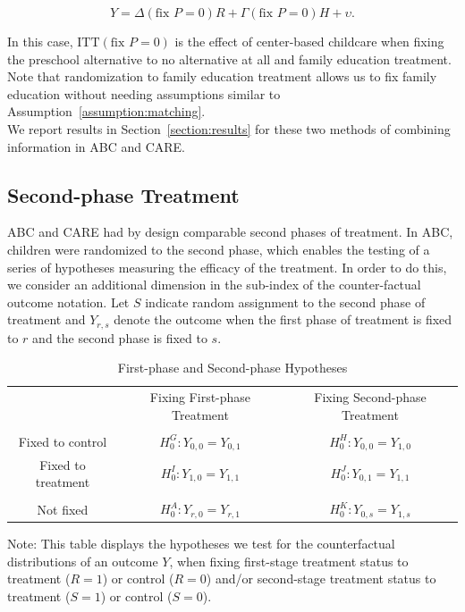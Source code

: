 \begin{equation}
Y = \Delta \left( \text{fix } P = 0\right) R +  \Gamma \left( \text{fix } P = 0\right) H + \upsilon. \label{eq:fixfam}
\end{equation}

\noindent In this case, $\text{ITT} \left( \text{fix } P = 0\right)$ is the effect of center-based childcare when fixing the preschool alternative to no alternative at all and family education treatment. Note that randomization to family education treatment allows us to fix family education without needing assumptions similar to Assumption~\ref{assumption:matching}.\\

\noindent We report results in Section~\ref{section:results} for these two methods of combining information in ABC and CARE.

\subsection{Second-phase Treatment}

\noindent ABC and CARE had by design comparable second phases of treatment. In ABC, children were randomized to the second phase, which enables the testing of a series of hypotheses measuring the efficacy of the treatment. 
In order to do this, we consider an additional dimension in the sub-index of the counter-factual outcome notation. Let $S$ indicate random assignment to the second phase of treatment and $Y_{r,s}$ denote the outcome when the first phase of treatment is fixed to $r$ and the second phase is fixed to $s$.\\

\begin{table}[H] 
\begin{threeparttable}
\caption{First-phase and Second-phase Hypotheses}
\label{table:hypotheses}
\centering 
\begin{tabular}{ccc} \hline \hline
 & Fixing First-phase Treatment & Fixing Second-phase Treatment \\ \\ \hline
Fixed to control       & $H_{0}^G: Y_{0,0} = Y_{0,1}$ & $H_{0}^H: Y_{0,0} = Y_{1,0}$ \\
Fixed to treatment  & $H_{0}^I: Y_{1,0} = Y_{1,1}$ & $H_{0}^J: Y_{0,1} = Y_{1,1}$ \\ \\ \hline
Not fixed                 & $H_{0}^A: Y_{r,0} = Y_{r,1}$ & $H_{0}^K: Y_{0,s} = Y_{1,s}$ \\  \hline \hline
\end{tabular}
\begin{tablenotes}
\footnotesize
\item Note: This table displays the hypotheses we test for the counterfactual distributions of an outcome $Y$, when fixing first-stage treatment status to treatment ($R = 1$) or control ($R = 0$) and/or second-stage treatment status to treatment ($S = 1$) or control ($S = 0$).
\end{tablenotes}
\end{threeparttable}
\end{table}

